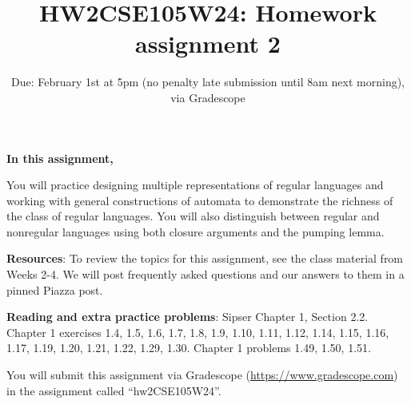 

\title{HW2CSE105W24: Homework assignment 2}
\date{Due: February 1st at 5pm (no penalty late submission until 8am next morning), via Gradescope}



\maketitle
\thispagestyle{fancy}

{\bf In this assignment,}

You will practice designing multiple representations of regular languages and working with 
general constructions of automata to demonstrate the richness of the class of regular languages.
You will also distinguish between regular and nonregular languages using both closure arguments and the pumping lemma.


{\bf Resources}: To review the topics 
for this assignment, see the class material from Weeks 2-4.
We will post frequently asked questions and our answers to them in a 
pinned Piazza post.

{\bf Reading and extra practice problems}:  
Sipser Chapter 1, Section 2.2. 
Chapter 1 exercises 1.4, 1.5, 1.6, 1.7, 1.8, 1.9, 1.10, 1.11, 1.12, 1.14, 1.15, 
1.16, 1.17, 1.19, 1.20, 1.21, 1.22, 1.29, 1.30. Chapter 1 problems 1.49, 1.50, 1.51.

\instructions

You will submit this assignment via Gradescope
(\href{https://www.gradescope.com}{https://www.gradescope.com}) 
in the assignment called ``hw2CSE105W24''.

